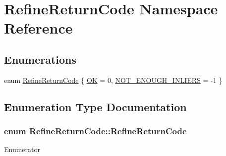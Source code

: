 \hypertarget{namespaceRefineReturnCode}{}\section{Refine\+Return\+Code Namespace Reference}
\label{namespaceRefineReturnCode}
\subsection*{Enumerations}
\begin{DoxyCompactItemize}
\item 
enum \hyperlink{namespaceRefineReturnCode_a54e2cd5f4af90ff2df55bf63455d1959}{Refine\+Return\+Code} \{ \hyperlink{namespaceRefineReturnCode_a54e2cd5f4af90ff2df55bf63455d1959af7afdc3f9a9d0e3ee3e177cf5f5f9841}{OK} = 0, 
\hyperlink{namespaceRefineReturnCode_a54e2cd5f4af90ff2df55bf63455d1959aa7e9b732c19c32b516e07f10aedd581c}{N\+O\+T\+\_\+\+E\+N\+O\+U\+G\+H\+\_\+\+I\+N\+L\+I\+E\+RS} = -\/1
 \}
\end{DoxyCompactItemize}


\subsection{Enumeration Type Documentation}
\subsubsection[{\texorpdfstring{Refine\+Return\+Code}{RefineReturnCode}}]{\setlength{\rightskip}{0pt plus 5cm}enum {\bf Refine\+Return\+Code\+::\+Refine\+Return\+Code}}\hypertarget{namespaceRefineReturnCode_a54e2cd5f4af90ff2df55bf63455d1959}{}\label{namespaceRefineReturnCode_a54e2cd5f4af90ff2df55bf63455d1959}
\begin{Desc}
\item[Enumerator]\par
\begin{description}
\item[{\em 
OK\hypertarget{namespaceRefineReturnCode_a54e2cd5f4af90ff2df55bf63455d1959af7afdc3f9a9d0e3ee3e177cf5f5f9841}{}\label{namespaceRefineReturnCode_a54e2cd5f4af90ff2df55bf63455d1959af7afdc3f9a9d0e3ee3e177cf5f5f9841}
}]\item[{\em 
N\+O\+T\+\_\+\+E\+N\+O\+U\+G\+H\+\_\+\+I\+N\+L\+I\+E\+RS\hypertarget{namespaceRefineReturnCode_a54e2cd5f4af90ff2df55bf63455d1959aa7e9b732c19c32b516e07f10aedd581c}{}\label{namespaceRefineReturnCode_a54e2cd5f4af90ff2df55bf63455d1959aa7e9b732c19c32b516e07f10aedd581c}
}]\end{description}
\end{Desc}
